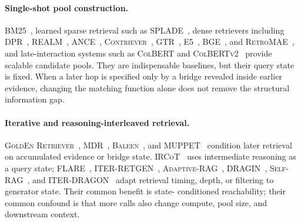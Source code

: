 \documentclass[manuscript,review]{acmart}
\theoremstyle{definition}
\theoremstyle{plain}
\theoremstyle{remark}
\begin{document}
\paragraph{Single-shot pool construction.}
BM25~\cite{robertson2009bm25}, learned sparse retrieval such as
\textsc{SPLADE}~\cite{formal2021splade}, dense retrievers including
\textsc{DPR}~\cite{karpukhin2020dpr}, \textsc{REALM}~\cite{guu2020realm},
\textsc{ANCE}~\cite{xiong2020ance}, \textsc{Contriever}~\cite{izacard2022contriever},
\textsc{GTR}~\cite{ni2022gtr}, \textsc{E5}~\cite{wang2022e5},
\textsc{BGE}~\cite{xiao2024bge}, and \textsc{RetroMAE}~\cite{xiao2022retromae},
and late-interaction systems such as \textsc{ColBERT} and
\textsc{ColBERTv2}~\cite{khattab2020colbert,santhanam2022colbertv2}
provide scalable candidate pools. They are indispensable baselines, but their
query state is fixed. When a later hop is specified only by a bridge revealed
inside earlier evidence, changing the matching function alone does not remove
the structural information gap.

\paragraph{Iterative and reasoning-interleaved retrieval.}
\textsc{GoldEn Retriever}~\cite{min2019golden}, \textsc{MDR}~\cite{xiong2021mdr},
\textsc{Baleen}~\cite{khattab2021baleen}, and \textsc{MUPPET}~\cite{feldman2019muppet}
condition later retrieval on accumulated evidence or bridge state.
\textsc{IRCoT}~\cite{trivedi2023ircot} uses intermediate reasoning as a
query state; \textsc{FLARE}~\cite{jiang2023flare},
\textsc{ITER-RETGEN}~\cite{shao2023iterretgen},
\textsc{Adaptive-RAG}~\cite{jeong2024adaptiverag},
\textsc{DRAGIN}~\cite{su2024dragin}, \textsc{Self-RAG}~\cite{asai2024selfrag},
and \textsc{ITER-DRAGON}~\cite{wu2024iterdragon} adapt retrieval timing,
depth, or filtering to generator state. Their common benefit is state-
conditioned reachability; their common confound is that more calls also
change compute, pool size, and downstream context.
\end{document}
